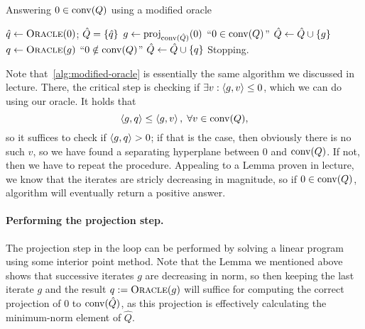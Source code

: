 \documentclass[10pt]{article}
\begin{document}
\begin{Answer}
	\begin{algorithm}[H]
		\caption{Answering $0 \in \mathrm{conv}(Q)$ using a modified oracle}
		\begin{algorithmic}
			\State $\hat{q} \gets \textsc{Oracle}(0)$; $\hat{Q} =
			\left\{ \hat{q} \right\}$ 
			\Repeat
				\State $g \gets \mathrm{proj}_{\mathrm{conv}(\hat{Q})}(0)$
					\State \Return ``$0 \in \mathrm{conv}(Q)$''
				\Else
					\State $\hat{Q} \gets \hat{Q} \cup \left\{ g \right\}$
				\EndIf
				\State $q \gets \textsc{Oracle}(g)$
					\State \Return ``$0 \notin \mathrm{conv}(Q)$''
				\EndIf
				\State $\hat{Q} \gets \hat{Q} \cup \left\{ q \right\}$
			\Until Stopping.
		\end{algorithmic}
		\label{alg:modified-oracle}
	\end{algorithm}
	Note that~\cref{alg:modified-oracle} is essentially the same algorithm we
	discussed in lecture. There, the critical step is checking if $\exists v:
	\left\langle g, v \right\rangle \leq 0$, which we can do using our oracle. It holds that
	\[
		\left\langle g, q \right\rangle \leq \left\langle g, v \right\rangle, \; \forall v \in \mathrm{conv}(Q),
	\]
	so it suffices to check if $\left\langle g, q \right\rangle > 0$; if that is the case, then
	obviously there is no such $v$, so we have found a separating hyperplane
	between $0$ and $\mathrm{conv}(Q)$. If not, then we have to repeat the
	procedure. Appealing to a Lemma proven in lecture, we know that the
	iterates are stricly decreasing in magnitude, so if $0 \in \mathrm{conv}(Q)$,
	algorithm will eventually return a positive answer.

	\paragraph{Performing the projection step.} The projection
	step in the loop can be performed by solving a linear program using some
	interior point method. Note that the Lemma we mentioned above shows that
	successive iterates $g$ are decreasing in norm, so then keeping the last
	iterate $g$ and the result $q := \textsc{Oracle}(g)$ will suffice for
	computing the correct projection of $0$ to $\mathrm{conv}(\hat{Q})$, as this
	projection is effectively calculating the minimum-norm element of
	$\hat{Q}$.
\end{Answer}




\end{document}
